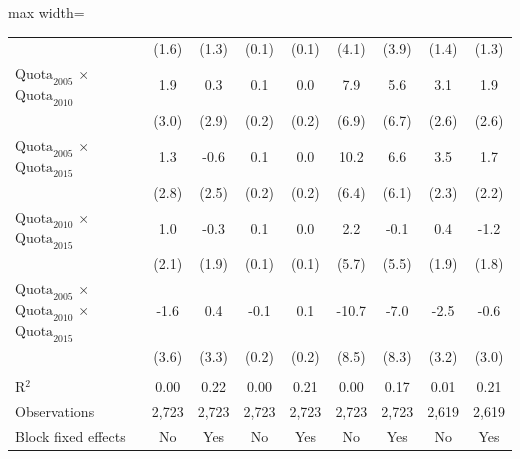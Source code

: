 \begin{table}[htbp]
\begin{adjustbox}{max width=\linewidth}
\begin{threeparttable}[b]
\begin{tabular}{lcccccccc}
                                                                                                     & (1.6)        & (1.3) & (0.1)       & (0.1) & (4.1)        & (3.9) & (1.4)       & (1.3)\\
            $\text{Quota}_{2005}$ $\times$ $\text{Quota}_{2010}$                                     & 1.9          & 0.3   & 0.1         & 0.0   & 7.9          & 5.6   & 3.1         & 1.9\\
                                                                                                     & (3.0)        & (2.9) & (0.2)       & (0.2) & (6.9)        & (6.7) & (2.6)       & (2.6)\\
            $\text{Quota}_{2005}$ $\times$ $\text{Quota}_{2015}$                                     & 1.3          & -0.6  & 0.1         & 0.0   & 10.2         & 6.6   & 3.5         & 1.7\\
                                                                                                     & (2.8)        & (2.5) & (0.2)       & (0.2) & (6.4)        & (6.1) & (2.3)       & (2.2)\\
            $\text{Quota}_{2010}$ $\times$ $\text{Quota}_{2015}$                                     & 1.0          & -0.3  & 0.1         & 0.0   & 2.2          & -0.1  & 0.4         & -1.2\\
                                                                                                     & (2.1)        & (1.9) & (0.1)       & (0.1) & (5.7)        & (5.5) & (1.9)       & (1.8)\\
            $\text{Quota}_{2005}$ $\times$ $\text{Quota}_{2010}$ $\times$ $\text{Quota}_{2015}$      & -1.6         & 0.4   & -0.1        & 0.1   & -10.7        & -7.0  & -2.5        & -0.6\\
                                                                                                     & (3.6)        & (3.3) & (0.2)       & (0.2) & (8.5)        & (8.3) & (3.2)       & (3.0)\\
             \\
            R$^2$                                                                                    & 0.00         & 0.22  & 0.00        & 0.21  & 0.00         & 0.17  & 0.01        & 0.21\\
            Observations                                                                             & 2,723        & 2,723 & 2,723       & 2,723 & 2,723        & 2,723 & 2,619       & 2,619\\
            Block fixed effects                                                                      & No           & Yes   & No          & Yes   & No           & Yes   & No          & Yes\\
            \bottomrule
         \end{tabular}


\end{threeparttable}
\end{adjustbox}
\end{table}
